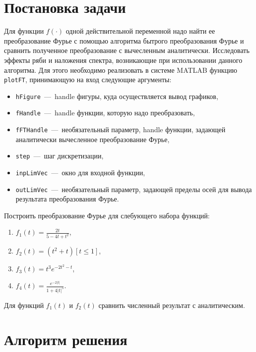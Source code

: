 \documentclass[12pt, a4paper]{article} %
\renewcommand{\le}{\leqslant}
\begin{document}


\tableofcontents

\section{Постановка задачи}

Для функции $f(\cdot)$ одной действительной переменной надо найти
ее преобразование Фурье с помощью алгоритма бытрого преобразования Фурье
и сравнить полученное преобразование с вычесленным аналитически.
Исследовать эффекты ряби и наложения спектра, возникающие при использовании
данного алгоритма.
Для этого необходимо реализовать в системе MATLAB функцию \texttt{plotFT},
принимающую на вход следующие аргументы:
\begin{itemize}
    \item \texttt{hFigure}~---~handle фигуры, куда осуществляется вывод
        графиков,
    \item \texttt{fHandle}~---~handle функции, которую надо преобразовать,
    \item \texttt{fFTHandle}~---~необязательный параметр, handle функции,
        задающей аналитически вычесленное преобразование Фурье,
    \item \texttt{step}~---~шаг дискретизации,
    \item \texttt{inpLimVec}~---~окно для входной функции,
    \item \texttt{outLimVec}~---~необязательный параметр, задающей пределы
        осей для вывода результата преобразования Фурье.
\end{itemize} 

Построить преобразование Фурье для слебующего набора функций:

\begin{enumerate}
    \item $\displaystyle f_1(t) = \frac{2t}{5 - 4t + t^2}$,
    \item $\displaystyle f_2(t) = \left( t^2 + t \right)[t \le 1]$,
    \item $\displaystyle f_3(t) = t^3 e^{-2t^2-t}$,
    \item $\displaystyle f_4(t) =
        \frac{e^{-2\lvert t \rvert }}{1 + 4\left\lvert t \right\rvert ^{5}}$.
\end{enumerate} 

Для функций $f_1(t)$ и $f_2(t)$ сравнить численный результат с аналитическим.

\section{Алгоритм решения}
\end{document}
